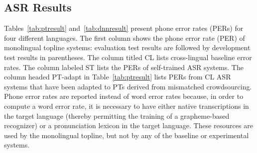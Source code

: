 \subsection{ASR Results}
\label{s6:mlbaseline}

Tables~\ref{tab:ptresult} and~\ref{tab:dnnresult} present phone error
rates (PERs) for four different languages.  {\color{blue} The first
  column shows the phone error rate (PER) of monolingual topline
  systems: evaluation test results are followed by development test
  results in parentheses.}  The column titled {\sc CL} lists
cross-lingual baseline error rates.  The column labeled {\sc ST} lists
the PERs of self-trained ASR systems.  The column headed {\sc
  PT-adapt} in Table~\ref{tab:ptresult} lists PERs from {\sc CL} ASR
systems that have been adapted to PTs {\color{blue} derived from
  mismatched crowdsourcing. Phone error rates are reported instead of
  word error rates because, in order to compute a word error rate, it
  is necessary to have either native transcriptions in the target
  language (thereby permitting the training of a grapheme-based
  recognizer) or a pronunciation lexicon in the target language.
  These resources are used by the monolingual topline, but not by any
  of the baseline or experimental systems.}



